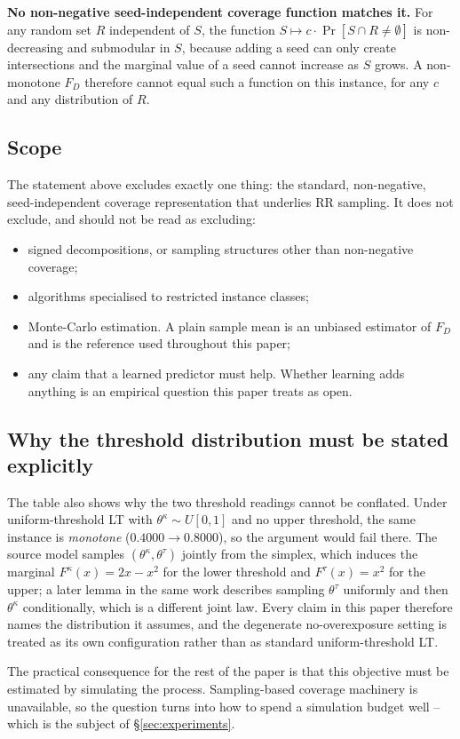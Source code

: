 \textbf{No non-negative seed-independent coverage function matches it.} For any random set $R$
independent of $S$, the function $S \mapsto c \cdot \Pr[S \cap R \neq \emptyset]$ is non-decreasing
and submodular in $S$, because adding a seed can only create intersections and the marginal value
of a seed cannot increase as $S$ grows.  A non-monotone $F_D$ therefore cannot equal such a
function on this instance, for any $c$ and any distribution of $R$.

\subsection{Scope}

The statement above excludes exactly one thing: the standard, non-negative, seed-independent
coverage representation that underlies RR sampling.  It does not exclude, and should not be read
as excluding:

\begin{itemize}
  \item signed decompositions, or sampling structures other than non-negative coverage;
  \item algorithms specialised to restricted instance classes;
  \item Monte-Carlo estimation.  A plain sample mean is an unbiased estimator of $F_D$ and is the
        reference used throughout this paper;
  \item any claim that a learned predictor must help.  Whether learning adds anything is an
        empirical question this paper treats as open.
\end{itemize}

\subsection{Why the threshold distribution must be stated explicitly}

The table also shows why the two threshold readings cannot be conflated.  Under
uniform-threshold LT with $\theta^\kappa \sim U[0,1]$ and no upper threshold, the same instance is
\emph{monotone} ($0.4000 \to 0.8000$), so the argument would fail there.  The
source model samples $(\theta^\kappa, \theta^\tau)$ jointly from the simplex, which induces the
marginal $F^\kappa(x) = 2x - x^2$ for the lower threshold and $F^\tau(x) = x^2$ for the upper; a
later lemma in the same work describes sampling $\theta^\tau$ uniformly and then
$\theta^\kappa$ conditionally, which is a different joint law.  Every claim in this paper
therefore names the distribution it assumes, and the degenerate no-overexposure setting is
treated as its own configuration rather than as standard uniform-threshold LT.

The practical consequence for the rest of the paper is that this objective must be estimated by
simulating the process.  Sampling-based coverage machinery is unavailable, so the question turns
into how to spend a simulation budget well -- which is the subject of \S\ref{sec:experiments}.
